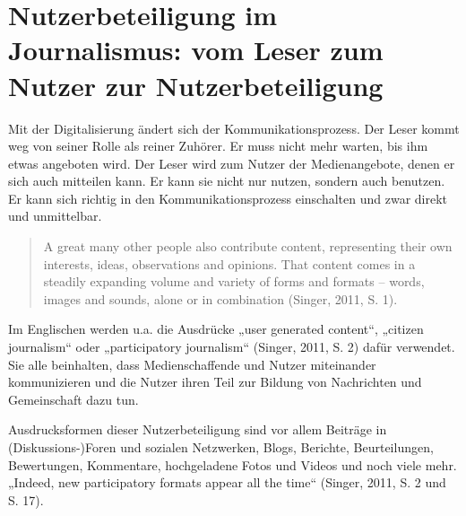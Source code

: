 \chapter{Nutzerbeteiligung im Journalismus: vom Leser zum Nutzer zur
Nutzerbeteiligung}

Mit der Digitalisierung ändert sich der Kommunikationsprozess. Der Leser kommt
weg von seiner Rolle als reiner Zuhörer. Er muss nicht mehr warten, bis ihm
etwas angeboten wird. Der Leser wird zum Nutzer der Medienangebote, denen er
sich auch mitteilen kann. Er kann sie nicht nur nutzen, sondern auch benutzen.
Er kann sich richtig in den Kommunikationsprozess einschalten und zwar direkt
und unmittelbar.

\begin{quote}
A great many other people also contribute content, representing their own
interests, ideas, observations and opinions. That content comes in a steadily
expanding volume and variety of forms and formats – words, images and sounds,
alone or in combination (Singer, 2011, S. 1).
\end{quote}

Im Englischen werden u.a. die Ausdrücke „user generated content“, „citizen
journalism“ oder „participatory journalism“ (Singer, 2011, S. 2) dafür
verwendet. Sie alle beinhalten, dass Medienschaffende und Nutzer miteinander
kommunizieren und die Nutzer ihren Teil zur Bildung von Nachrichten und
Gemeinschaft dazu tun.

Ausdrucksformen dieser Nutzerbeteiligung sind vor allem Beiträge in
(Diskussions-)Foren und sozialen Netzwerken, Blogs, Berichte, Beurteilungen,
Bewertungen, Kommentare, hochgeladene Fotos und Videos und noch viele mehr.
„Indeed, new participatory formats appear all the time“ (Singer, 2011, S. 2 und
S. 17).


